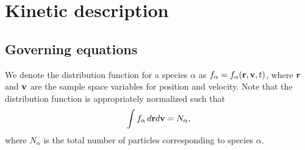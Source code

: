 \documentclass[oneside,a4paper,11pt]{report}
\begin{document}
%
%
\part{Kinetic description}
%
%
\chapter{Governing equations}

We denote the distribution function for a species $\alpha$ as $f_\alpha = f_\alpha(\mathbf{r}, \mathbf{v}, t)$, where $\mathbf{r}$ and $\mathbf{v}$ are the sample space variables for position and velocity. Note that the distribution function is appropriately normalized such that
\begin{equation}
\int f_\alpha \, d\mathbf{r} d\mathbf{v} = N_\alpha,
\end{equation}
where $N_\alpha$ is the total number of particles corresponding to species $\alpha$. 
\end{document}
